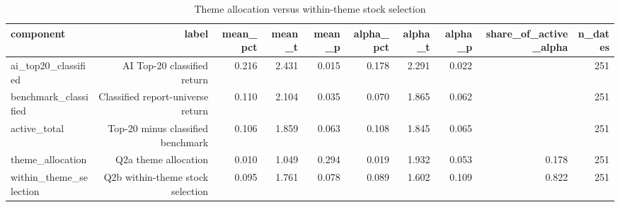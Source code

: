 \begin{table}[!htbp]\centering
\caption{Theme allocation versus within-theme stock selection}
\label{tab:theme_allocation_selection}
\begin{tabular}{lrrrrrrrrr}
\toprule
component & label & mean\_pct & mean\_t & mean\_p & alpha\_pct & alpha\_t & alpha\_p & share\_of\_active\_alpha & n\_dates \\
\midrule
ai\_top20\_classified & AI Top-20 classified return & 0.216 & 2.431 & 0.015 & 0.178 & 2.291 & 0.022 &  & 251 \\
benchmark\_classified & Classified report-universe return & 0.110 & 2.104 & 0.035 & 0.070 & 1.865 & 0.062 &  & 251 \\
active\_total & Top-20 minus classified benchmark & 0.106 & 1.859 & 0.063 & 0.108 & 1.845 & 0.065 &  & 251 \\
theme\_allocation & Q2a theme allocation & 0.010 & 1.049 & 0.294 & 0.019 & 1.932 & 0.053 & 0.178 & 251 \\
within\_theme\_selection & Q2b within-theme stock selection & 0.095 & 1.761 & 0.078 & 0.089 & 1.602 & 0.109 & 0.822 & 251 \\
\bottomrule
\end{tabular}
\end{table}
